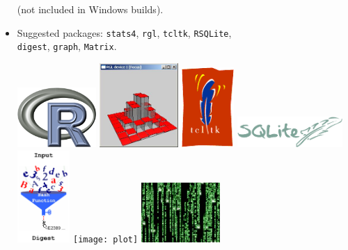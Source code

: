 \documentclass[landscape]{foils}
\begin{document}
\begin{itemize}
  (not included in Windows builds). 
  \marginpar{\vspace*{-1.5cm}}
  \\[-10pt]\pause
\item Suggested packages: \texttt{stats4}, \texttt{rgl}, 
  \texttt{tcltk}, \texttt{RSQLite},\\
  \texttt{digest}, \texttt{graph},
  \texttt{Matrix}.\\
\begin{flushright}
\includegraphics[width=3cm]{Rlogo-2}
\includegraphics[width=3cm]{hist3d_2lights}
\includegraphics[width=2cm]{logo125}
\includegraphics[width=4cm]{SQLite}
\includegraphics[width=2cm]{hash_small}
\texttt{[image: plot]}
\includegraphics[width=3cm]{matrix}
\end{flushright}
\end{itemize}
\end{document}

